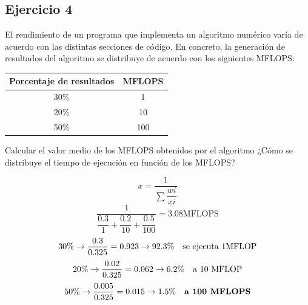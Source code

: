 \subsection{Ejercicio 4}
\noindent
El rendimiento de un programa que implementa un algoritmo numérico varía de acuerdo con las distintas secciones de código. En concreto, la generación de resultados del algoritmo se distribuye de acuerdo con los siguientes MFLOPS:
\begin{table}[H]
\centering
\begin{tabular}{|c|c|}
\hline
\textbf{Porcentaje de resultados} & \textbf{MFLOPS} \\ \hline
30\%                              & 1               \\ \hline
20\%                              & 10              \\ \hline
50\%                              & 100             \\ \hline
\end{tabular}
\end{table}
\noindent
Calcular el valor medio de los MFLOPS obtenidos por el algoritmo ¿Cómo se distribuye el tiempo de ejecución en función de los MFLOPS?
\begin{tcolorbox}[colback=white,colframe=cyan!50!black,fonttitle=\bfseries]
\[
x=\dfrac{1}{\sum\dfrac{wi}{xi}}
\]
\[
\dfrac{1}{\dfrac{0.3}{1}+\dfrac{0.2}{10}+\dfrac{0.5}{100}}=3.08\text{MFLOPS}
\]
\[
30\%\rightarrow\dfrac{0.3}{0.325}=0.923\rightarrow 92.3\%\quad\text{se ejecuta 1MFLOP}
\]
\[
20\%\rightarrow\dfrac{0.02}{0.325}=0.062\rightarrow 6.2\%\quad\text{a 10 MFLOP}
\]
\[
50\%\rightarrow\dfrac{0.005}{0.325}=0.015\rightarrow 1.5\%\quad\textbf{a 100 MFLOPS}
\]
\end{tcolorbox}
